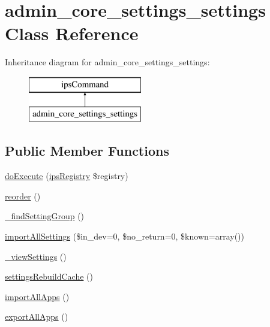 \hypertarget{classadmin__core__settings__settings}{\section{admin\-\_\-core\-\_\-settings\-\_\-settings Class Reference}
\label{classadmin__core__settings__settings}
}
Inheritance diagram for admin\-\_\-core\-\_\-settings\-\_\-settings\-:\begin{figure}[H]
\begin{center}
\leavevmode
\includegraphics[height=2.000000cm]{classadmin__core__settings__settings}
\end{center}
\end{figure}
\subsection*{Public Member Functions}
\begin{DoxyCompactItemize}
\item 
\hyperlink{classadmin__core__settings__settings_afbc4e912a0604b94d47d66744c64d8ba}{do\-Execute} (\hyperlink{classips_registry}{ips\-Registry} \$registry)
\item 
\hyperlink{classadmin__core__settings__settings_a2a3efef985575940ce6326e11cb85bd8}{reorder} ()
\item 
\hyperlink{classadmin__core__settings__settings_a3c8f54ba16181d26e9d3295731e09ae6}{\-\_\-find\-Setting\-Group} ()
\item 
\hyperlink{classadmin__core__settings__settings_a31b842a961c4c756fc3be00b7f48842b}{import\-All\-Settings} (\$in\-\_\-dev=0, \$no\-\_\-return=0, \$known=array())
\item 
\hyperlink{classadmin__core__settings__settings_a6dadb5bbda5849cb2fcfec8f0b0d562d}{\-\_\-view\-Settings} ()
\item 
\hyperlink{classadmin__core__settings__settings_a9738eed248ab7df3c943bfbc3b39c8d6}{settings\-Rebuild\-Cache} ()
\item 
\hyperlink{classadmin__core__settings__settings_a01b762e3e856b316d271d1288b08c034}{import\-All\-Apps} ()
\item 
\hyperlink{classadmin__core__settings__settings_ad30af0762a67013c3971eb51827eff38}{export\-All\-Apps} ()
\end{DoxyCompactItemize}

